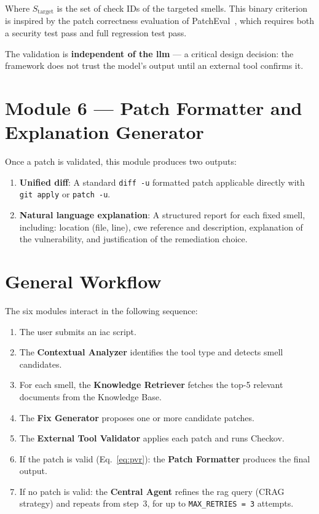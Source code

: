 \documentclass[12pt, a4paper]{report}
\begin{document}
Where $S_{\text{target}}$ is the set of check IDs of the targeted smells. This binary
criterion is inspired by the patch correctness evaluation of PatchEval~\citep{lyu2024patcheval},
which requires both a security test pass and full regression test pass.

The validation is \textbf{independent of the \gls{llm}} --- a critical design
decision: the framework does not trust the model's output until an external tool
confirms it.

\section{Module 6 --- Patch Formatter and Explanation Generator}

Once a patch is validated, this module produces two outputs:

\begin{enumerate}
  \item \textbf{Unified diff}: A standard \texttt{diff -u} formatted patch applicable
  directly with \texttt{git apply} or \texttt{patch -u}.

  \item \textbf{Natural language explanation}: A structured report for each fixed smell,
  including: location (file, line), \gls{cwe} reference and description, explanation of
  the vulnerability, and justification of the remediation choice.
\end{enumerate}

\section{General Workflow}

The six modules interact in the following sequence:

\begin{enumerate}
  \item The user submits an \gls{iac} script.
  \item The \textbf{Contextual Analyzer} identifies the tool type and detects smell candidates.
  \item For each smell, the \textbf{Knowledge Retriever} fetches the top-5 relevant
  documents from the Knowledge Base.
  \item The \textbf{Fix Generator} proposes one or more candidate patches.
  \item The \textbf{External Tool Validator} applies each patch and runs Checkov.
  \item If the patch is valid (Eq.~\ref{eq:pvr}): the \textbf{Patch Formatter} produces
  the final output.
  \item If no patch is valid: the \textbf{Central Agent} refines the \gls{rag} query
  (CRAG strategy) and repeats from step~3, for up to \texttt{MAX\_RETRIES = 3} attempts.
\end{enumerate}
\end{document}
